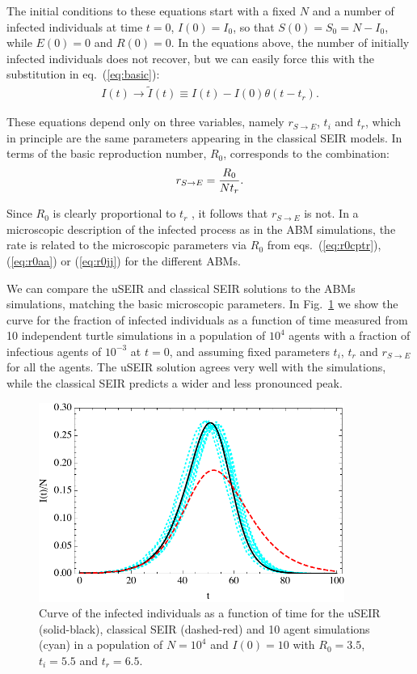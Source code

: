 \documentclass[a4paper,oneside,11pt]{article}
\begin{document}
The initial conditions to these equations start with a fixed $N$ and a number of infected individuals at time $t=0$, $I(0)= I_0$, so that $S(0)=S_0 = N-I_0$, while $E(0)=0$ and $R(0)=0$.
In the  equations above, the number of initially infected individuals does not recover, but we can easily force this with the substitution in eq.~(\ref{eq:basic}):
\begin{eqnarray}
I(t) \rightarrow \tilde{I}(t) \equiv I(t) - I(0) \theta(t-t_r).
\end{eqnarray}

These equations depend only on three variables, namely $r_{S\rightarrow E}$, $t_i$ and $t_r$, which in principle are the same parameters appearing in the classical SEIR models. In terms of the 
basic reproduction number, $R_0$,  corresponds to the combination:
\begin{eqnarray}
r_{S\rightarrow E} = {R_0\over N t_r}.
\end{eqnarray}

Since $R_0$ is clearly proportional to $t_r$ , it follows that $r_{S\rightarrow E}$ is not. In a microscopic description of the infected process as in the ABM simulations, the rate is related to the microscopic parameters via $R_0$ from eqs.~(\ref{eq:r0cptr}), (\ref{eq:r0aa}) or (\ref{eq:r0jj}) for the different ABMs.

  We can compare the uSEIR and classical SEIR solutions to the ABMs simulations, matching the basic microscopic parameters. 
In Fig.~\ref{fig:fixed} we show the curve for the fraction of infected individuals as a function of time measured from 10 independent turtle simulations in a population of $10^4$ agents with a fraction of infectious agents of $10^{-3}$ at $t=0$, and assuming fixed parameters $t_i$, $t_r$ and $r_{S\rightarrow E}$ for all the agents. The uSEIR solution agrees very well with the simulations, while the classical SEIR predicts a wider and less pronounced peak.

\begin{figure}[h!]
  \centering
  \includegraphics[width=10cm]{fixedraw.pdf}
  \caption{ Curve of the infected individuals as a function of time for the uSEIR (solid-black), classical SEIR (dashed-red) and 10 agent simulations (cyan) in a  population of $N=10^4$ and $I(0)=10$ with $R_0=3.5$, $t_i=5.5$ and $t_r=6.5$.  }
  \label{fig:fixed}
   \end{figure}
\end{document}
